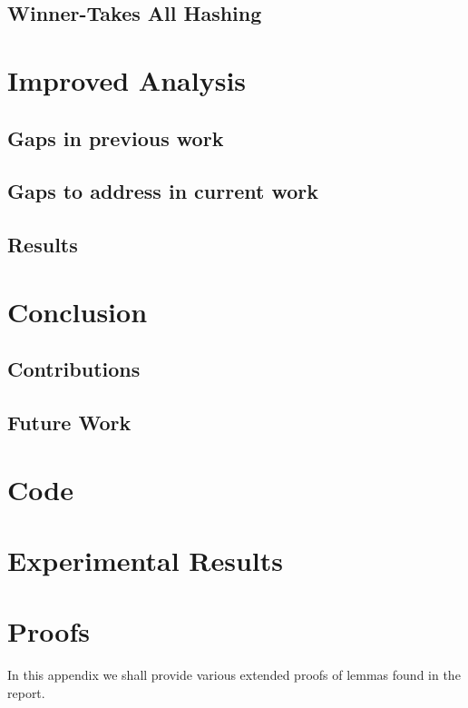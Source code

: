 \documentclass[fyp]{socreport}
\begin{document}
\section{Winner-Takes All Hashing}

\chapter{Improved Analysis}
\section{Gaps in previous work}
\section{Gaps to address in current work}
\section{Results}

\chapter{Conclusion}
\section{Contributions}
\section{Future Work}




\appendix
\chapter{Code}
\chapter{Experimental Results}
\chapter{Proofs}
In this appendix we shall provide various extended proofs of lemmas found in the report. 
\end{document}
